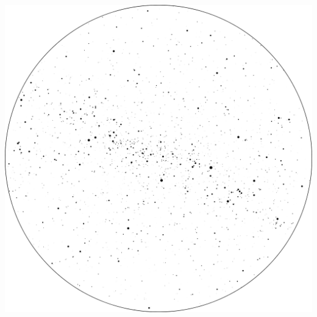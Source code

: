 \documentclass{SAS-class-skygen}
\begin{document}
	\vspace{0.5cm}
    \begin{center}
    \includegraphics[width=\textwidth]{./pics/sky_chart9.png}
    \end{center}
    
    
\end{document}

